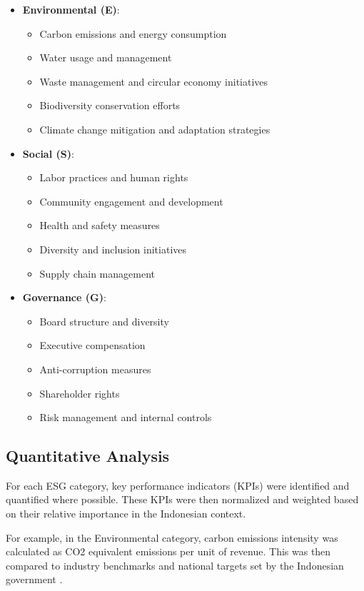 \begin{itemize}
    \item \textbf{Environmental (E)}:
    \begin{itemize}
        \item Carbon emissions and energy consumption
        \item Water usage and management
        \item Waste management and circular economy initiatives
        \item Biodiversity conservation efforts
        \item Climate change mitigation and adaptation strategies
    \end{itemize}
    \item \textbf{Social (S)}:
    \begin{itemize}
        \item Labor practices and human rights
        \item Community engagement and development
        \item Health and safety measures
        \item Diversity and inclusion initiatives
        \item Supply chain management
    \end{itemize}
    \item \textbf{Governance (G)}:
    \begin{itemize}
        \item Board structure and diversity
        \item Executive compensation
        \item Anti-corruption measures
        \item Shareholder rights
        \item Risk management and internal controls
    \end{itemize}
\end{itemize}

\subsection{Quantitative Analysis}

For each ESG category, key performance indicators (KPIs) were identified and quantified where possible. These KPIs were then normalized and weighted based on their relative importance in the Indonesian context.

For example, in the Environmental category, carbon emissions intensity was calculated as CO2 equivalent emissions per unit of revenue. This was then compared to industry benchmarks and national targets set by the Indonesian government \cite{IndonesiaNDC2021}.

